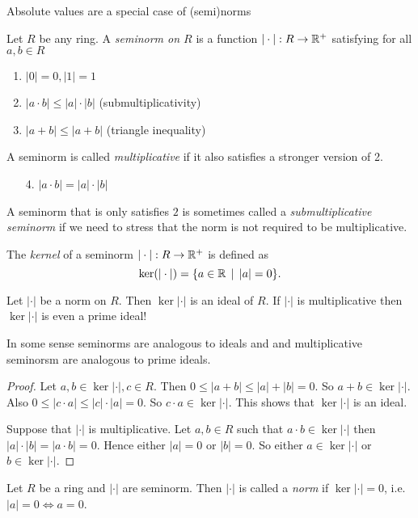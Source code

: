 Absolute values are a special case of (semi)norms
\begin{definition}
	Let $R$ be any ring. A \emph{seminorm on $R$} is a function $|\cdot |: R \to \mathbb{R}^{+}$ satisfying for all $a, b \in R$ 
	\begin{enumerate}
		\item $|0| = 0, |1| = 1$ 
		\item $|a \cdot b| \le |a | \cdot |b|$  (submultiplicativity)
		\item $|a + b| \le |a + b|$ (triangle inequality)
	\end{enumerate}
	A seminorm is called \emph{multiplicative} if it also satisfies a stronger version of 2. 
	\begin{enumerate}
		\item [4.]  $|a \cdot  b| = |a | \cdot |b|$
	\end{enumerate}
	A seminorm that is only satisfies $2$ is sometimes called a \emph{submultiplicative seminorm} if we need to stress that the norm is not required to be multiplicative. 
\end{definition}

\begin{definition}
	The \emph{kernel} of a seminorm $|\cdot |: R \to \mathbb{R}^{+}$ is defined as \[
		\ker(|\cdot |) = \{a \in \R \st |a| = 0\} 
	.\] 
\end{definition}
\begin{remark}\label{rem:ker_norm_ideal}
	Let $ |\cdot |$ be a norm on $R$. Then $\ker |\cdot |$ is an ideal of $R$. If $|\cdot |$ is multiplicative then $\ker |\cdot |$ is even a prime ideal!

	In some sense seminorms are analogous to ideals and and multiplicative seminorsm are analogous to prime ideals. 
\end{remark}
\begin{proof}
	Let $a, b \in \ker |\cdot |, c \in R$. Then $0 \le |a + b| \le |a|+|b| = 0$. So  $a + b \in \ker |\cdot |$. 
	Also $0 \le |c \cdot a| \le |c|\cdot |a| = 0$. So $c \cdot a \in \ker |\cdot |$. 
	This shows that $\ker |\cdot  |$ is an ideal. 
	
	Suppose that $|\cdot |$ is multiplicative. 
	Let $a, b\in R $ such that $a\cdot b \in \ker |\cdot |$ then  $|a|\cdot |b| = |a\cdot b| = 0$. 
	Hence either $|a| = 0$ or  $|b|=0$. 
	So either  $a \in \ker |\cdot |$ or $b \in \ker |\cdot |$. 
\end{proof}

\begin{definition}
	Let $R$ be a ring and $|\cdot |$ are seminorm. 
	Then $|\cdot |$ is called a \emph{norm} if $\ker |\cdot | = 0$, i.e.\ $|a| = 0 \iff a = 0$. 
\end{definition}

